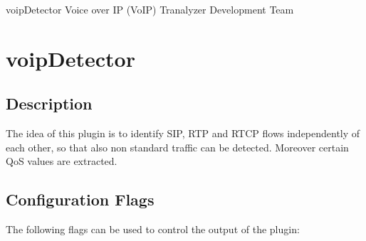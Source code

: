 \documentclass[documentation]{subfiles}
\begin{document}
\trantitle
    {voipDetector}
    {Voice over IP (VoIP)}
    {Tranalyzer Development Team}

\section{voipDetector}\label{s:voipDetector}

\subsection{Description}
The idea of this plugin is to identify SIP, RTP and RTCP flows independently of each other, so
that also non standard traffic can be detected. Moreover certain QoS values are extracted.

\subsection{Configuration Flags}
The following flags can be used to control the output of the plugin:
\end{document}
